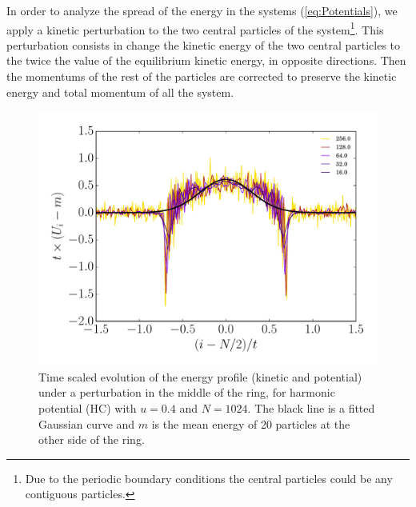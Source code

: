 \documentclass[aps,pre,showpacs,twocolumn,superscriptaddress,floatfix]{revtex4-1}
\begin{document}
{In order to analyze the spread of the energy in the systems 
(\ref{eq:Potentials}), we apply a kinetic perturbation to the two 
central particles of the system\footnote{Due to the periodic 
boundary conditions the central particles could be any contiguous particles.}.
This perturbation consists in change the kinetic energy of the 
two central particles to the twice the value 
of the equilibrium kinetic energy, in opposite directions. 
Then the momentums of the rest of the particles are 
corrected to preserve the kinetic energy and 
total momentum of all the system.



\begin{figure}
 \centering
 \includegraphics[width=1.0\linewidth]{./Time_NrgProf_HC__U0_0.4__N_1024.pdf}
 \caption{Time scaled evolution of the energy profile (kinetic and potential) 
 under a perturbation in the middle of the ring, for harmonic potential (HC)
 with $u=0.4$ and $N=1024$. The black line is a fitted Gaussian curve and $m$ 
 is the mean energy of 20 particles at the other side of the ring.}
 \label{fig:Time_NrgProf_HC}
\end{figure}


}
\end{document}
